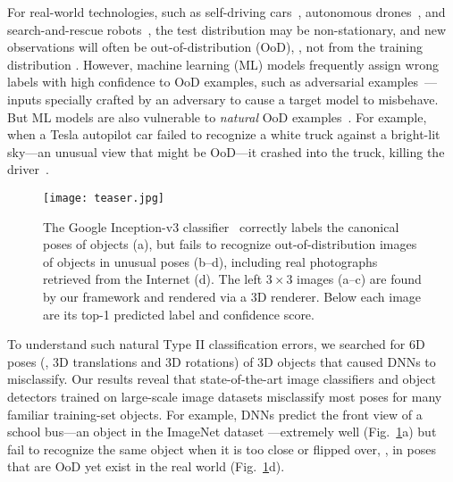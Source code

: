 \documentclass[10pt,twocolumn,letterpaper]{article}
\begin{document}
For real-world technologies, such as self-driving cars~\cite{chen2015deepdriving}, autonomous drones~\cite{gandhi2017learning}, and search-and-rescue robots~\cite{sampedro2018fully}, the test distribution may be non-stationary, and new observations will often be out-of-distribution (OoD), \ie, not 
from the training distribution \cite{sugiyama2017dataset}.
However, machine learning (ML) models frequently assign wrong labels with high confidence to OoD examples, such as adversarial examples~\cite{szegedy2013intriguing,nguyen2015deep}---inputs specially crafted by an adversary to cause a target model to misbehave.
But ML models are also vulnerable to \emph{natural} OoD examples~\cite{lambert2016understanding,uber2017killed,tian2017deeptest,tesla2016killed}.
For example, when a Tesla autopilot car failed to recognize a white truck against a bright-lit sky---an unusual view that might be OoD---it crashed into the truck, killing the driver~\cite{tesla2016killed}.

\begin{figure}[t]
	\texttt{[image: teaser.jpg]}
	
	\caption{
		The Google Inception-v3 classifier~\cite{szegedy2016rethinking} correctly labels the canonical poses of objects (a), but fails to recognize out-of-distribution images of objects in unusual poses (b--d), including real photographs retrieved from the Internet (d).
		The left $3 \times 3$ images (a--c) are found by our framework and rendered via a 3D renderer.
		Below each image are its top-1 predicted label and confidence score.
	}\label{fig:teaser}
\end{figure}

To understand such natural Type II classification errors, we searched for 6D poses (\ie, 3D translations and 3D rotations) of 3D objects that caused DNNs to misclassify.
Our results reveal that state-of-the-art image classifiers and object detectors trained on large-scale image datasets \cite{russakovsky2015imagenet,lin2014microsoft} misclassify most poses for many familiar training-set objects.
For example, DNNs predict the front view of a school bus---an object in the ImageNet dataset \cite{russakovsky2015imagenet}---extremely well (Fig.~\ref{fig:teaser}a) but fail to recognize the same object when it is too close or flipped over, \ie, in poses that are OoD yet exist in the real world (Fig.~\ref{fig:teaser}d).
\end{document}
